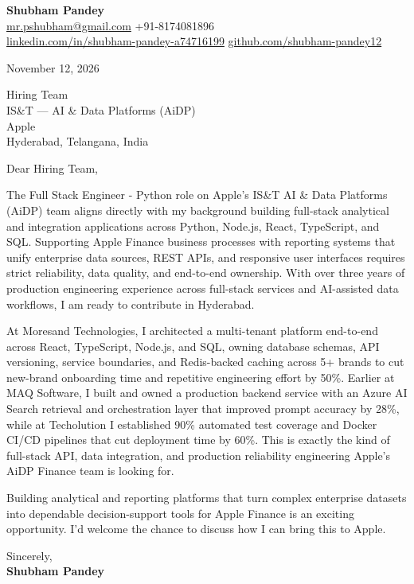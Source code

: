 \documentclass[a4paper,11pt]{article}
\begin{document}
\textbf{\Large Shubham Pandey}\\
\href{mailto:mr.pshubham@gmail.com}{mr.pshubham@gmail.com} \quad +91-8174081896\\
\href{https://www.linkedin.com/in/shubham-pandey-a74716199/}{linkedin.com/in/shubham-pandey-a74716199} \quad
\href{https://github.com/shubham-pandey12}{github.com/shubham-pandey12}

\vspace{1em}
November 12, 2026

\vspace{1em}
Hiring Team\\
IS\&T --- AI \& Data Platforms (AiDP)\\
Apple\\
Hyderabad, Telangana, India

\vspace{1em}
Dear Hiring Team,

The Full Stack Engineer - Python role on Apple's IS\&T AI \& Data Platforms (AiDP) team aligns directly with my background building full-stack analytical and integration applications across Python, Node.js, React, TypeScript, and SQL. Supporting Apple Finance business processes with reporting systems that unify enterprise data sources, REST APIs, and responsive user interfaces requires strict reliability, data quality, and end-to-end ownership. With over three years of production engineering experience across full-stack services and AI-assisted data workflows, I am ready to contribute in Hyderabad.

At Moresand Technologies, I architected a multi-tenant platform end-to-end across React, TypeScript, Node.js, and SQL, owning database schemas, API versioning, service boundaries, and Redis-backed caching across 5+ brands to cut new-brand onboarding time and repetitive engineering effort by 50\%. Earlier at MAQ Software, I built and owned a production backend service with an Azure AI Search retrieval and orchestration layer that improved prompt accuracy by 28\%, while at Techolution I established 90\% automated test coverage and Docker CI/CD pipelines that cut deployment time by 60\%. This is exactly the kind of full-stack API, data integration, and production reliability engineering Apple's AiDP Finance team is looking for.

Building analytical and reporting platforms that turn complex enterprise datasets into dependable decision-support tools for Apple Finance is an exciting opportunity. I'd welcome the chance to discuss how I can bring this to Apple.

\vspace{1em}
Sincerely,\\[0.5em]
\textbf{Shubham Pandey}
\end{document}
